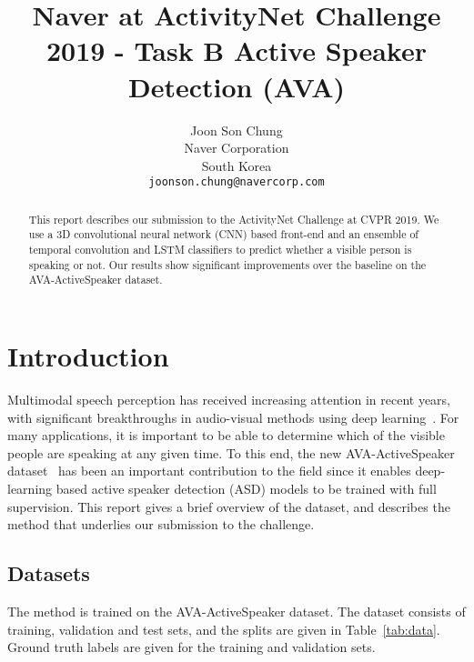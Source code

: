 \documentclass[10pt,twocolumn,letterpaper]{article}
\begin{document}
\title{Naver at ActivityNet Challenge 2019 - Task B Active Speaker Detection (AVA)}

\author{Joon Son Chung\\
Naver Corporation\\
South Korea\\
{\tt\small joonson.chung@navercorp.com}
}

\maketitle


\begin{abstract}
This report describes our submission to the ActivityNet Challenge at CVPR 2019. We use a 3D convolutional neural network (CNN) based front-end and an ensemble of temporal convolution and LSTM classifiers to predict whether a visible person is speaking or not. Our results show significant improvements over the baseline on the AVA-ActiveSpeaker dataset.
\end{abstract}

\section{Introduction}

Multimodal speech perception has received increasing attention in recent years, with significant breakthroughs in audio-visual methods using deep learning~\cite{Afouras19,Afouras18,assael2016lipnet,ephrat2018looking,noda2015audio}. For many applications, it is important to be able to determine which of the visible people are speaking at any given time. To this end, the new AVA-ActiveSpeaker dataset~\cite{roth2019ava} has been an important contribution to the field since it enables deep-learning based active speaker detection (ASD) models to be trained with full supervision. This report gives a brief overview of the dataset, and describes the method that underlies our submission to the challenge.

\subsection{Datasets}

The method is trained on the AVA-ActiveSpeaker dataset. The dataset consists of training, validation and test sets, and the splits are given in Table~\ref{tab:data}. Ground truth labels are given for the training and validation sets.
\end{document}
